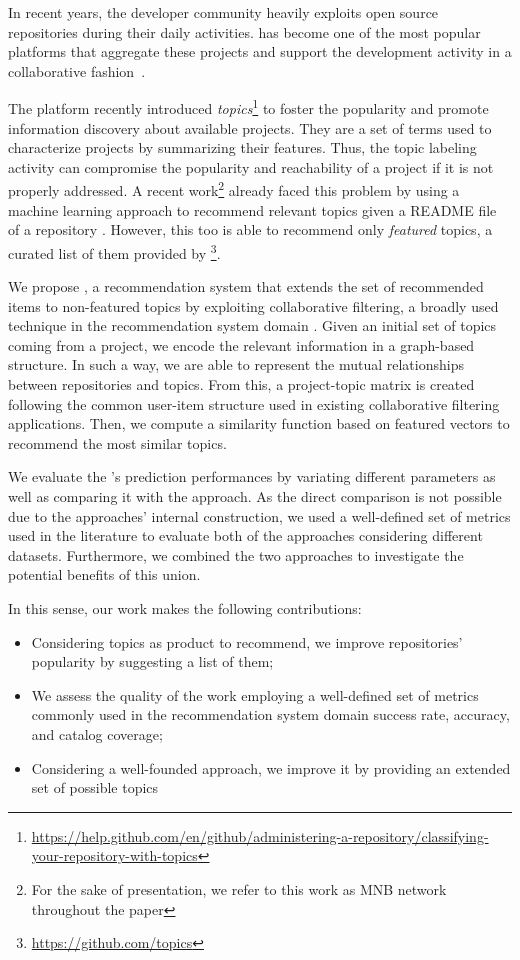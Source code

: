 In recent years, the developer community heavily exploits open source repositories during their daily activities. \GH has become one of the most
popular platforms that aggregate these projects and
support the development activity in a collaborative fashion~\cite{7832894}.
%

The platform recently introduced \emph{topics}\footnote{\url{https://help.github.com/en/github/administering-a-repository/classifying-your-repository-with-topics}} to foster the popularity and promote information discovery about available projects. They are a set of terms used to characterize projects by summarizing their features.  
Thus, the topic labeling activity can compromise the popularity and reachability of a project if it is not properly addressed. A recent work\footnote{For the sake of presentation, we refer to this work as MNB network throughout the paper} already faced this problem by using a machine learning approach to recommend relevant topics given a README file of a repository \cite{10.1145/3383219.3383227}. However, this too is able to recommend only \emph{featured} topics, a curated list of them provided by \GH\footnote{\url{https://github.com/topics}}.

 
We propose \CT, a recommendation system that extends the set of recommended items to non-featured topics by exploiting collaborative filtering, a broadly used technique in the recommendation system domain \cite{Schafer:2007:CFR:1768197.1768208}. Given an initial set of topics coming from a \GH project, we encode the relevant information in a graph-based structure. In such a way, we are able to represent the mutual relationships between repositories and topics. From this, a project-topic matrix is created following the common user-item structure used in existing collaborative filtering applications. Then, we compute a similarity function based on featured vectors to recommend the most similar topics.

We evaluate the \CT's prediction performances by variating different parameters as well as comparing it with the \MNB approach. As the direct comparison is not possible due to the approaches' internal construction, we used a well-defined set of metrics used in the literature to evaluate both of the approaches considering different datasets. Furthermore, we combined the two approaches to investigate the potential benefits of this union. 

In this sense, our work makes the following contributions:
\begin{itemize}
\item Considering \GH topics as product to recommend, we improve repositories' popularity by suggesting a list of them;
\item We assess the quality of the work employing a well-defined set of metrics commonly used in the recommendation system domain \ie success rate, accuracy, and catalog coverage;
\item Considering a well-founded approach, we improve it by providing an extended set of possible topics  
\end{itemize}

